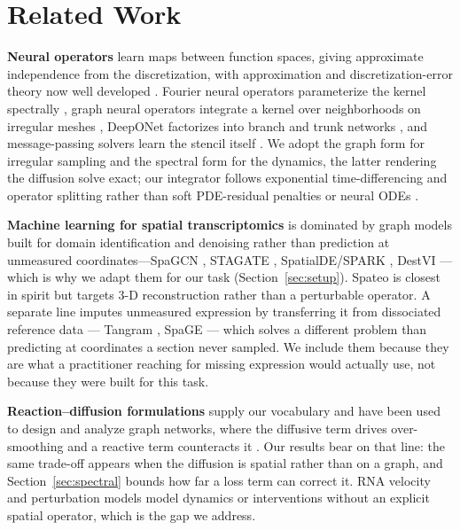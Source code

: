 \section{Related Work}

\textbf{Neural operators} learn maps between function spaces, giving approximate
independence from the discretization, with approximation and discretization-error
theory now well developed \citep{kovachki2023neuraloperator}. Fourier neural
operators parameterize the kernel spectrally \citep{li2021fno}, graph neural
operators integrate a kernel over neighborhoods on irregular meshes
\citep{li2020gno}, DeepONet factorizes into branch and trunk networks
\citep{lu2021deeponet}, and message-passing solvers learn the stencil itself
\citep{brandstetter2022message}. We adopt the graph form for irregular sampling
and the spectral form for the dynamics, the latter rendering the diffusion solve
exact; our integrator follows exponential time-differencing and operator
splitting \citep{cox2002etdrk,strang1968splitting} rather than soft PDE-residual
penalties \citep{raissi2019pinn} or neural ODEs \citep{chen2018neuralode}.

\textbf{Machine learning for spatial transcriptomics} is dominated by graph
models built for domain identification and denoising rather than prediction at
unmeasured coordinates---SpaGCN \citep{hu2021spagcn}, STAGATE
\citep{dong2022stagate}, SpatialDE/SPARK
\citep{svensson2018spatialde,sun2020spark}, DestVI \citep{lopez2022destvi}---which
is why we adapt them for our task (Section~\ref{sec:setup}). Spateo
\citep{qiu2024spateo} is closest in spirit but targets 3-D reconstruction rather
than a perturbable operator. A separate line imputes unmeasured expression by
transferring it from dissociated reference data --- Tangram
\citep{biancalani2021tangram}, SpaGE \citep{abdelaal2020spage} --- which solves
a different problem than predicting at coordinates a section never sampled. We
include them because they are what a practitioner reaching for missing expression
would actually use, not because they were built for this task.

\textbf{Reaction--diffusion formulations} supply our vocabulary
\citep{turing1952,kondo2010reaction,green2015morphogen} and have been used to
design and analyze graph networks, where the diffusive term drives over-smoothing
and a reactive term counteracts it \citep{grand2021,gread2022}. Our results bear
on that line: the same trade-off appears when the diffusion is spatial rather
than on a graph, and Section~\ref{sec:spectral} bounds how far a loss term can
correct it. RNA velocity \citep{bergen2020scvelo} and perturbation models
\citep{lotfollahi2019scgen,roohani2024gears} model dynamics or interventions
without an explicit spatial operator, which is the gap we address.
